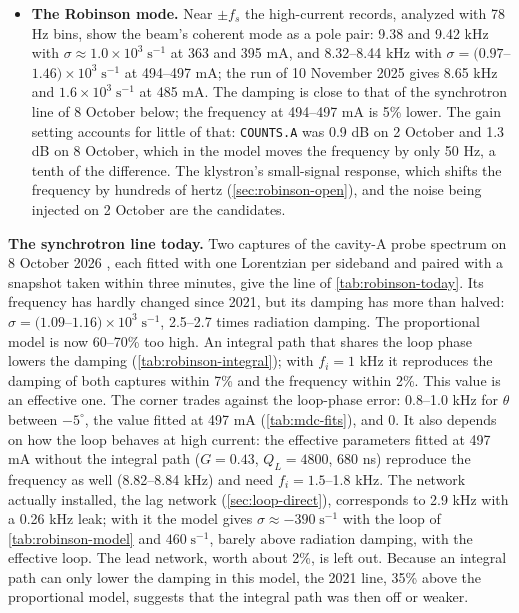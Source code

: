 \begin{itemize}
\item \textbf{The Robinson mode.} Near \(\pm f_s\) the high-current records, analyzed with 78 Hz bins, show the beam's coherent mode as a pole pair: 9.38 and 9.42 kHz with \(\sigma \approx 1.0\times10^3\;\text{s}^{-1}\) at 363 and 395 mA, and 8.32--8.44 kHz with \(\sigma = (0.97\)--\(1.46)\times10^3\;\text{s}^{-1}\) at 494--497 mA; the run of 10 November 2025 gives 8.65 kHz and \(1.6\times10^3\;\text{s}^{-1}\) at 485 mA. The damping is close to that of the synchrotron line of 8 October below; the frequency at 494--497 mA is 5\% lower. The gain setting accounts for little of that: \texttt{COUNTS.A} was 0.9 dB on 2 October and 1.3 dB on 8 October, which in the model moves the frequency by only 50 Hz, a tenth of the difference. The klystron's small-signal response, which shifts the frequency by hundreds of hertz (\cref{sec:robinson-open}), and the noise being injected on 2 October are the candidates.
\end{itemize}

\textbf{The synchrotron line today.} Two captures of the cavity-A probe spectrum on 8 October 2026 , each fitted with one Lorentzian per sideband and paired with a snapshot taken within three minutes, give the line of \cref{tab:robinson-today}. Its frequency has hardly changed since 2021, but its damping has more than halved: \(\sigma = (1.09\)--\(1.16)\times10^3\;\text{s}^{-1}\), 2.5--2.7 times radiation damping. The proportional model is now 60--70\% too high. An integral path that shares the loop phase lowers the damping (\cref{tab:robinson-integral}); with \(f_i = 1\) kHz it reproduces the damping of both captures within 7\% and the frequency within 2\%. This value is an effective one. The corner trades against the loop-phase error: 0.8--1.0 kHz for \(\theta\) between \(-5^\circ\), the value fitted at 497 mA (\cref{tab:mdc-fits}), and 0. It also depends on how the loop behaves at high current: the effective parameters fitted at 497 mA without the integral path (\(G = 0.43\), \(Q_L = 4800\), 680 ns) reproduce the frequency as well (8.82--8.84 kHz) and need \(f_i = 1.5\)--1.8 kHz. The network actually installed, the lag network (\cref{sec:loop-direct}), corresponds to 2.9 kHz with a 0.26 kHz leak; with it the model gives \(\sigma \approx -390\;\text{s}^{-1}\) with the loop of \cref{tab:robinson-model} and \(460\;\text{s}^{-1}\), barely above radiation damping, with the effective loop. The lead network, worth about 2\%, is left out. Because an integral path can only lower the damping in this model, the 2021 line, 35\% above the proportional model, suggests that the integral path was then off or weaker.

